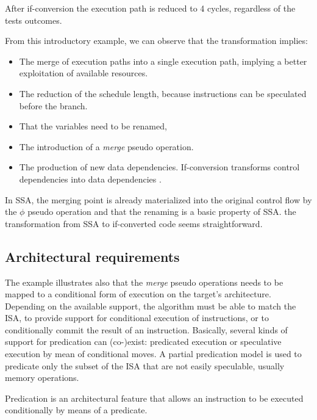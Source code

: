After if-conversion the execution path is reduced to 4 cycles, regardless of the tests outcomes. 

From this introductory example, we can observe that the transformation implies:

\begin{itemize}
\item The merge of execution paths into a single execution path, implying a  better exploitation of available resources.  
\item The reduction of the schedule length, because instructions can be speculated before the branch.
\item That the variables need to be renamed, 
\item The introduction of a \textit{merge} pseudo operation.
\item The production of new data dependencies. If-conversion transforms control dependencies into data dependencies \cite{Allen:1983:CCD:567067.567085}. 
\end{itemize}

In SSA, the merging point is already materialized into the original control flow by the $\phi$ pseudo operation and that the renaming is a basic property of SSA. the transformation from SSA to if-converted code seems straightforward.

\subsection{Architectural requirements}
The example illustrates also that the \textit{merge} pseudo operations needs to be mapped to a conditional form of execution on the target's architecture. Depending on the available support, the algorithm must be able to match the ISA, to provide support for conditional execution of instructions, or to conditionally commit the result of an instruction.
Basically, several kinds of support for predication can (co-)exist: predicated execution  or speculative execution by mean of conditional moves. A partial predication model is used to predicate only the subset of the ISA that are not easily speculable, usually memory operations.

Predication is an architectural feature that allows an instruction to be executed conditionally by means of a predicate.

